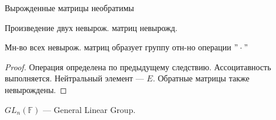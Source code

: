 \begin{consequence}
Вырожденные матрицы необратимы
\end{consequence}
\begin{consequence}
Произведение двух невырож. матриц невырожд.
\end{consequence}
\begin{consequence}
  Мн-во всех невырож. матриц образует группу отн-но операции $"\cdot"$
\end{consequence}
\begin{proof}
Операция определена по предыдущему следствию. Ассоцитавность выполняется. Нейтральный элемент --- $E$. Обратные матрицы также невырождены.
\end{proof}
\begin{symb} 
  $GL_n(\mathbb{F})$ --- General Linear Group. 
\end{symb}
